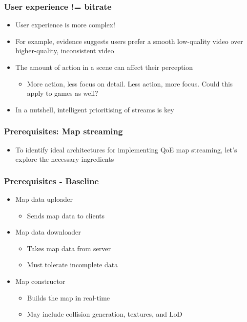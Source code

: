 \documentclass{beamer}
\begin{document}
\begin{frame}
\frametitle{User experience != bitrate}
\begin{itemize}
\item User experience is more complex!
\item For example, evidence suggests users prefer a smooth low-quality video over higher-quality, inconsistent video \cite{qoesmallstudy} \cite{qoelargestudy}
\item The amount of action in a scene can affect their perception \cite{qoelargestudy}
\begin{itemize}
\item More action, less focus on detail. Less action, more focus. Could this apply to games as well?
\end{itemize}
\item In a nutshell, intelligent prioritising of streams is key
\end{itemize}
\end{frame}

\begin{frame}
\frametitle{Prerequisites: Map streaming}
\begin{itemize}
	\item To identify ideal architectures for implementing QoE map streaming, let’s explore the necessary ingredients
\end{itemize}
\end{frame}

\begin{frame}
\frametitle{Prerequisites - Baseline}
\begin{itemize}
\item Map data uploader
\begin{itemize}
	\item Sends map data to clients
\end{itemize}
\item Map data downloader
\begin{itemize}
	\item Takes map data from server
	\item Must tolerate incomplete data
\end{itemize}
\item Map constructor
\begin{itemize}
	\item Builds the map in real-time
	\item May include collision generation, textures, and LoD
\end{itemize}
\end{itemize}
\end{frame}
\end{document}
